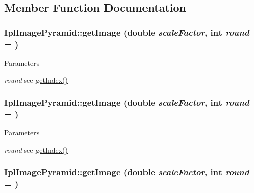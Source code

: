 \subsection{Member Function Documentation}
\hypertarget{class_ipl_image_pyramid_a73af0a82dfdca6eaa25a75b3c73996a3}{
\subsubsection[{getImage}]{ IplImagePyramid::getImage (double {\em scaleFactor}, \/  int {\em round} = {})}}
\label{class_ipl_image_pyramid_a73af0a82dfdca6eaa25a75b3c73996a3}

\begin{DoxyParams}{Parameters}
\item[{\em round}]see \hyperlink{class_ipl_image_pyramid_a079949237facf732d588900b143ed3d6}{getIndex()} \end{DoxyParams}
\hypertarget{class_ipl_image_pyramid_a73af0a82dfdca6eaa25a75b3c73996a3}{
\subsubsection[{getImage}]{ IplImagePyramid::getImage (double {\em scaleFactor}, \/  int {\em round} = {})}}
\label{class_ipl_image_pyramid_a73af0a82dfdca6eaa25a75b3c73996a3}

\begin{DoxyParams}{Parameters}
\item[{\em round}]see \hyperlink{class_ipl_image_pyramid_a079949237facf732d588900b143ed3d6}{getIndex()} \end{DoxyParams}
\hypertarget{class_ipl_image_pyramid_a73af0a82dfdca6eaa25a75b3c73996a3}{
\subsubsection[{getImage}]{ IplImagePyramid::getImage (double {\em scaleFactor}, \/  int {\em round} = {})}}
\label{class_ipl_image_pyramid_a73af0a82dfdca6eaa25a75b3c73996a3}


